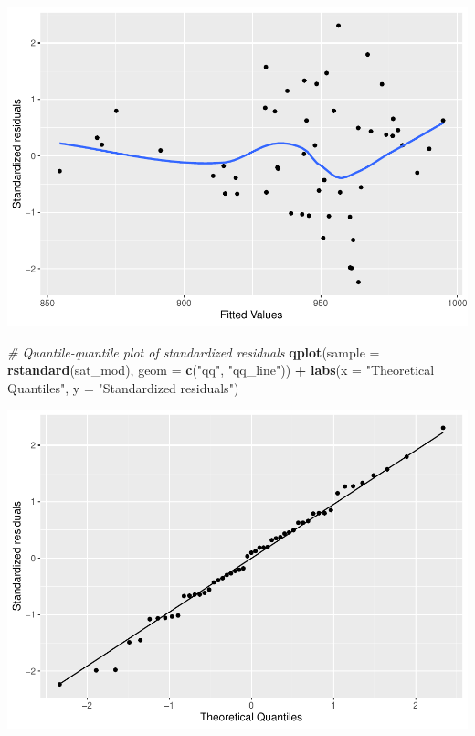 \documentclass[
]{book}
\newenvironment{Shaded}{\begin{snugshade}}{\end{snugshade}}
\newcommand{\CommentTok}[1]{\textcolor[rgb]{0.56,0.35,0.01}{\textit{#1}}}
\newcommand{\DataTypeTok}[1]{\textcolor[rgb]{0.13,0.29,0.53}{#1}}
\newcommand{\KeywordTok}[1]{\textcolor[rgb]{0.13,0.29,0.53}{\textbf{#1}}}
\newcommand{\NormalTok}[1]{#1}
\newcommand{\OperatorTok}[1]{\textcolor[rgb]{0.81,0.36,0.00}{\textbf{#1}}}
\newcommand{\StringTok}[1]{\textcolor[rgb]{0.31,0.60,0.02}{#1}}
\begin{document}
\includegraphics{R/Rmodels/figures/unnamed-chunk-97-1.pdf}

\begin{Shaded}
\begin{Highlighting}[]
  \CommentTok{\# Quantile{-}quantile plot of standardized residuals}
  \KeywordTok{qplot}\NormalTok{(}\DataTypeTok{sample =} \KeywordTok{rstandard}\NormalTok{(sat\_mod), }\DataTypeTok{geom =} \KeywordTok{c}\NormalTok{(}\StringTok{"qq"}\NormalTok{, }\StringTok{"qq\_line"}\NormalTok{)) }\OperatorTok{+}\StringTok{ }
\StringTok{      }\KeywordTok{labs}\NormalTok{(}\DataTypeTok{x =} \StringTok{"Theoretical Quantiles"}\NormalTok{, }\DataTypeTok{y =} \StringTok{"Standardized residuals"}\NormalTok{)}
\end{Highlighting}
\end{Shaded}

\includegraphics{R/Rmodels/figures/unnamed-chunk-97-2.pdf}
\end{document}
